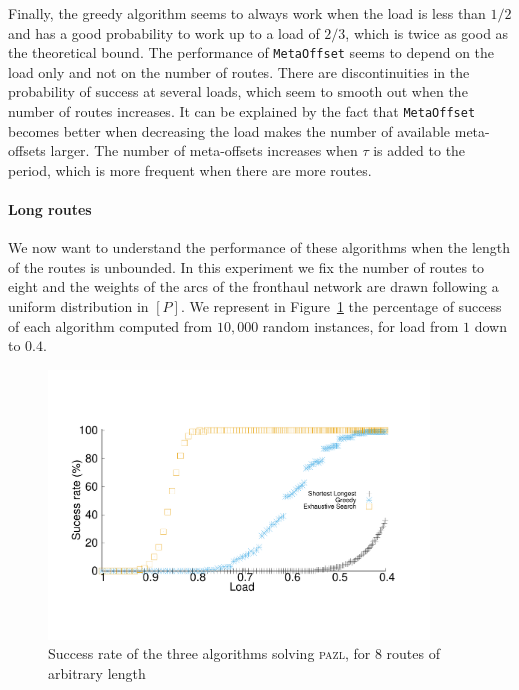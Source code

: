 \documentclass[a4paper,10pt]{journal}
\newcommand\metaoffset{\texttt{MetaOffset}\xspace}
\newcommand\pazl{\textsc{pazl}\xspace}
\begin{document}
Finally, the greedy algorithm seems to always work when the load is less than $1/2$ and has a good probability to work up to a load of $2/3$, which is twice as good as the theoretical bound. The performance of \metaoffset seems to depend on the load only and not on the number of routes. There are discontinuities in the probability of success at several loads, which seem to smooth out when the number of routes increases. It can be explained by the fact that \metaoffset becomes better when decreasing the load makes the number of available meta-offsets larger. The number of meta-offsets increases when $\tau$ is added to the period, which is more frequent when there are more routes.
      
        \paragraph{Long routes}
      
      We now want to understand the performance of these algorithms when the length of the routes is unbounded. In this experiment we fix the number of routes to eight and the weights of the arcs of the fronthaul network are drawn following a uniform distribution in $[P]$. We represent in Figure~\ref{fig:long} the percentage of success of each algorithm computed from $10,000$ random instances, for load from $1$ down to $0.4$.
\begin{figure}[h]

       \begin{center}
      \includegraphics[width=0.9\textwidth]{echec_longues.pdf}
      \end{center}
        
      \caption{Success rate of the three algorithms solving \pazl, for $8$ routes of arbitrary length}\label{fig:long}
     \end{figure}
      
\end{document}
